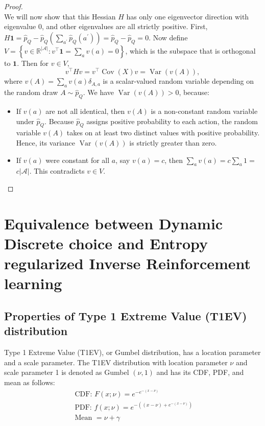 \begin{proof}
\;
\\
We will now show that this Hessian $H$ has only one eigenvector direction with eigenvalue 0, and other eigenvalues are all strictly positive. First, $H \mathbf{1}=\hat{p}_Q-\hat{p}_Q\left(\sum_{a^{\prime}} \hat{p}_Q\left(a^{\prime}\right)\right)=\hat{p}_Q-\hat{p}_Q=0$. 
Now define $V=\left\{v \in \mathbb{R}^{|\mathcal{A}|}: v^{\top} \mathbf{1}=\sum_a v(a)=0\right\}$, which is the subspace that is orthogonal to $\mathbf{1}$. Then for $v \in V$,
$$
v^{\top} H v=v^{\top} \operatorname{Cov}(X) v=\operatorname{Var}(v(A)),
$$
where $v(A)=\sum_a v(a) \delta_{A, a}$ is a scalar-valued random variable depending on the random draw $A \sim \hat{p}_Q$. We have $\operatorname{Var}(v(A))>0$, because:
\begin{itemize}
    \item If $v(a)$ are not all identical, then $v(A)$ is a non-constant random variable under $\hat{p}_Q$. Because $\hat{p}_Q$ assigns positive probability to each action, the random variable $v(A)$ takes on at least two distinct values with positive probability. Hence, its variance $\operatorname{Var}(v(A))$ is strictly greater than zero.
    \item If $v(a)$ were constant for all $a$, say $v(a)=c$, then $\sum_a v(a)=c \sum_a 1=$ $c|\mathcal{A}|$. This contradicts $v\in V$.
\end{itemize}
    
\end{proof} 

\fi
\newpage

\section{Equivalence between Dynamic Discrete choice and Entropy regularized Inverse Reinforcement learning}\label{sec:DDCIRL}


\subsection{Properties of Type 1 Extreme Value (T1EV) distribution}
Type 1 Extreme Value (T1EV), or Gumbel distribution, has a location parameter and a scale parameter. The T1EV distribution with location parameter $\nu$ and scale parameter 1 is denoted as Gumbel $(\nu, 1)$ and has its CDF, PDF, and mean as follows:
$$
\begin{gathered}
\text { CDF: } F(x ; \nu)=e^{-e^{-(x-\nu)}}
\\
\text { PDF: } f(x ; \nu)=e^{-\left((x-\nu)+e^{-(x-\nu)}\right)}
\\
\text { Mean } = \nu + \gamma
\end{gathered}
$$


